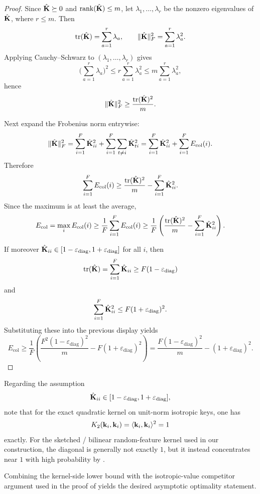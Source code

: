 \begin{proof}
Since $\hat{\mathbf{K}} \succeq 0$ and $\operatorname{rank}(\hat{\mathbf{K}})\le m$, let
$\lambda_{1},\dots,\lambda_{r}$ be the nonzero eigenvalues of $\hat{\mathbf{K}}$, where $r\le m$. Then
\[
\operatorname{tr}(\hat{\mathbf{K}})=\sum_{a=1}^r \lambda_{a},
\qquad
\|\hat{\mathbf{K}}\|_{F}^2=\sum_{a=1}^r \lambda_{a}^2.
\]
Applying Cauchy--Schwarz to $(\lambda_{1},\dots,\lambda_{r})$ gives
\[
\Big(\sum_{a=1}^r \lambda_{a}\Big)^2
\le r\sum_{a=1}^r \lambda_{a}^2
\le m\sum_{a=1}^r \lambda_{a}^2,
\]
hence
\[
\|\hat{\mathbf{K}}\|_{F}^2 \ge \frac{\operatorname{tr}(\hat{\mathbf{K}})^2}{m}.
\]

Next expand the Frobenius norm entrywise:
\[
\|\hat{\mathbf{K}}\|_{F}^2
=
\sum_{i=1}^F \hat{\mathbf{K}}_{ii}^2
+
\sum_{i=1}^F\sum_{t\neq i}\hat{\mathbf{K}}_{ti}^2
=
\sum_{i=1}^F \hat{\mathbf{K}}_{ii}^2
+
\sum_{i=1}^F E_{\mathrm{col}}(i).
\]
Therefore
\[
\sum_{i=1}^F E_{\mathrm{col}}(i)
\ge
\frac{\operatorname{tr}(\hat{\mathbf{K}})^2}{m}
-
\sum_{i=1}^F \hat{\mathbf{K}}_{ii}^2.
\]
Since the maximum is at least the average,
\[
E_{\mathrm{col}}
=
\max_{i} E_{\mathrm{col}}(i)
\ge
\frac{1}{F}\sum_{i=1}^F E_{\mathrm{col}}(i)
\ge
\frac{1}{F}\left(
\frac{\operatorname{tr}(\hat{\mathbf{K}})^2}{m}
-
\sum_{i=1}^F \hat{\mathbf{K}}_{ii}^2
\right).
\]

If moreover $\hat{\mathbf{K}}_{ii}\in[1-\varepsilon_{\mathrm{diag}},1+\varepsilon_{\mathrm{diag}}]$ for all $i$,
then
\[
\operatorname{tr}(\hat{\mathbf{K}})=\sum_{i=1}^F \hat{\mathbf{K}}_{ii} \ge F(1-\varepsilon_{\mathrm{diag}})
\]
and
\[
\sum_{i=1}^F \hat{\mathbf{K}}_{ii}^2 \le F(1+\varepsilon_{\mathrm{diag}})^2.
\]
Substituting these into the previous display yields
\[
E_{\mathrm{col}}
\ge
\frac{1}{F}\left(
\frac{F^2(1-\varepsilon_{\mathrm{diag}})^2}{m}
-
F(1+\varepsilon_{\mathrm{diag}})^2
\right)
=
\frac{F(1-\varepsilon_{\mathrm{diag}})^2}{m}
-
(1+\varepsilon_{\mathrm{diag}})^2.
\]
\end{proof}

Regarding the assumption
\[
\hat{\mathbf{K}}_{ii}\in[1-\varepsilon_{\mathrm{diag}},1+\varepsilon_{\mathrm{diag}}],
\]
note that for the exact quadratic kernel on unit-norm isotropic keys, one has
\[
K_{2}({\mathbf{k}}_{i},{\mathbf{k}}_{i})=\langle {\mathbf{k}}_{i},{\mathbf{k}}_{i}\rangle^2 = 1
\]
exactly.
For the sketched / bilinear random-feature kernel used in our construction, the diagonal is generally not exactly $1$, but it instead concentrates near $1$ with high probability by .

Combining the kernel-side lower bound with the isotropic-value competitor argument used in the
proof of  yields the desired asymptotic optimality statement.

